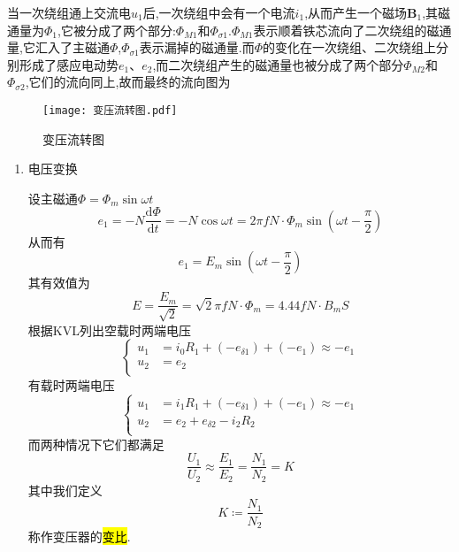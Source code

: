 \Par 当一次绕组通上交流电$u_1$后,一次绕组中会有一个电流$i_1$,从而产生一个磁场$\boldsymbol{B}_1$,其磁通量为$\varPhi _1$,它被分成了两个部分:$\varPhi _{M1}$和$\varPhi _{\sigma 1}$.$\varPhi _{M1}$表示顺着铁芯流向了二次绕组的磁通量,它汇入了主磁通$\varPhi $,$\varPhi _{\sigma 1}$表示漏掉的磁通量.而$\varPhi $的变化在一次绕组、二次绕组上分别形成了感应电动势$e_1$、$e_2$,而二次绕组产生的磁通量也被分成了两个部分$\varPhi _{M2}$和$\varPhi _{\sigma 2}$,它们的流向同上,故而最终的流向图为
\begin{figure}[htbp]
	\centering
	\texttt{[image: 变压流转图.pdf]}
	\caption{变压流转图}
	\label{fig:变压流转图}
\end{figure}
\begin{enumerate}
    \item[\circledtext{1}]电压变换
    
    设主磁通$\varPhi =\varPhi _m\sin \omega t$
    \begin{equation*}
        e_1=-N\frac{\mathrm{d}\varPhi}{\mathrm{d}t}=-N\cos \omega t=2\pi fN\cdot \varPhi _m\sin \left( \omega t-\frac{\pi}{2} \right)  
    \end{equation*}
    从而有
    \begin{equation*}
        e_1=E_m\sin \left( \omega t-\frac{\pi}{2} \right) 
    \end{equation*}
    其有效值为
    \begin{equation*}
        E=\frac{E_m}{\sqrt{2}}=\sqrt{2}\pi fN\cdot \varPhi _m=4.44fN\cdot B_mS
    \end{equation*}
    根据KVL列出空载时两端电压
    \begin{equation*}
        \left\{ \begin{aligned}
            u_1&=i_0R_1+\left( -e_{\delta 1} \right) +\left( -e_1 \right) \approx -e_1\\
            u_2&=e_2\\
        \end{aligned} \right. 
    \end{equation*}
    有载时两端电压
    \begin{equation*}
        \left\{ \begin{aligned}
            u_1&=i_1R_1+\left( -e_{\delta 1} \right) +\left( -e_1 \right) \approx -e_1\\
            u_2&=e_2+e_{\delta 2}-i_2R_2\\
        \end{aligned} \right. 
    \end{equation*}
    而两种情况下它们都满足
    \begin{equation*}
        \frac{U_1}{U_2}\approx \frac{E_1}{E_2}=\frac{N_1}{N_2}=K
    \end{equation*}
    其中我们定义
    \begin{equation}
        K\coloneqq \frac{N_1}{N_2}
    \end{equation}
    称作变压器的\hl{变比}.


\end{enumerate}
